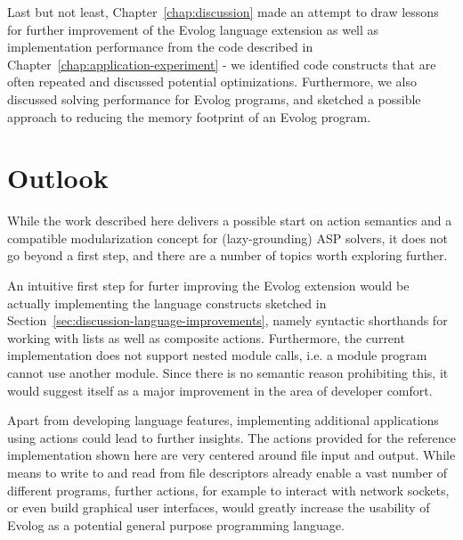 Last but not least, Chapter~\ref{chap:discussion} made an attempt to draw lessons for further improvement of the Evolog language extension as well as implementation performance from the code described in Chapter~\ref{chap:application-experiment} - we identified code constructs that are often repeated and discussed potential optimizations. Furthermore, we also discussed solving performance for Evolog programs, and sketched a possible approach to reducing the memory footprint of an Evolog program.

\section{Outlook}

While the work described here delivers a possible start on action semantics and a compatible modularization concept for (lazy-grounding) ASP solvers, it does not go beyond a first step, and there are a number of topics worth exploring further.

An intuitive first step for furter improving the Evolog extension would be actually implementing the language constructs sketched in Section~\ref{sec:discussion-language-improvements}, namely syntactic shorthands for working with lists as well as composite actions. Furthermore, the current implementation does not support nested module calls, i.e. a module program cannot use another module. Since there is no semantic reason prohibiting this, it would suggest itself as a major improvement in the area of developer comfort.

Apart from developing language features, implementing additional applications using actions could lead to further insights. The actions provided for the reference implementation shown here are very centered around file input and output. While means to write to and read from file descriptors already enable a vast number of different programs, further actions, for example to interact with network sockets, or even build graphical user interfaces, would greatly increase the usability of Evolog as a potential general purpose programming language.